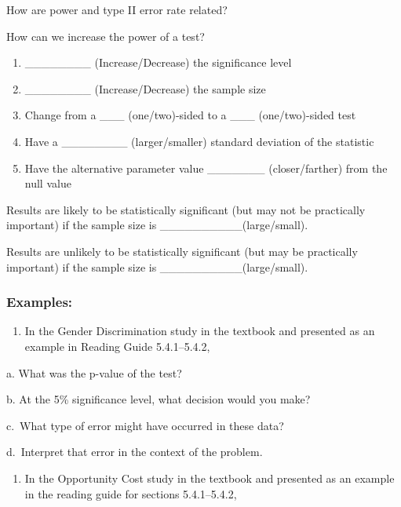 \documentclass[
]{report}
\providecommand{\tightlist}{%
  \setlength{\itemsep}{0pt}\setlength{\parskip}{0pt}}
\newcommand{\rgs}{\vspace{12pt}} %
\newcommand{\rgi}{\hspace{24pt}}  %
\begin{document}
How are power and type II error rate related?
\rgs

How can we increase the power of a test?

\begin{enumerate}
\def\labelenumi{\arabic{enumi}.}
\item
  \_\_\_\_\_\_\_\_ (Increase/Decrease) the significance level
  \rgs
\item
  \_\_\_\_\_\_\_\_ (Increase/Decrease) the sample size
  \rgs
\item
  Change from a \_\_\_ (one/two)-sided to a \_\_\_ (one/two)-sided test
  \rgs
\item
  Have a \_\_\_\_\_\_\_\_ (larger/smaller) standard deviation of the statistic
  \rgs
\item
  Have the alternative parameter value \_\_\_\_\_\_\_ (closer/farther) from the null value
  \rgs
\end{enumerate}

Results are likely to be statistically significant (but may not be practically important) if the sample size is \_\_\_\_\_\_\_\_\_\_(large/small).
\rgs

Results are unlikely to be statistically significant (but may be practically important) if the sample size is \_\_\_\_\_\_\_\_\_\_(large/small).
\rgs

\hypertarget{examples}{%
\subsubsection*{Examples:}\label{examples}}

\begin{enumerate}
\def\labelenumi{\arabic{enumi}.}
\tightlist
\item
  In the Gender Discrimination study in the textbook and presented as an example in Reading Guide 5.4.1--5.4.2,
\end{enumerate}

\rgi a. What was the p-value of the test?
\rgs

\rgi b. At the 5\% significance level, what decision would you make?
\rgs

\rgi c.~What type of error might have occurred in these data?
\rgs

\rgi d.~Interpret that error in the context of the problem.
\rgs
\rgs

\begin{enumerate}
\def\labelenumi{\arabic{enumi}.}
\setcounter{enumi}{1}
\tightlist
\item
  In the Opportunity Cost study in the textbook and presented as an example in the reading guide for sections 5.4.1--5.4.2,
\end{enumerate}
\end{document}
